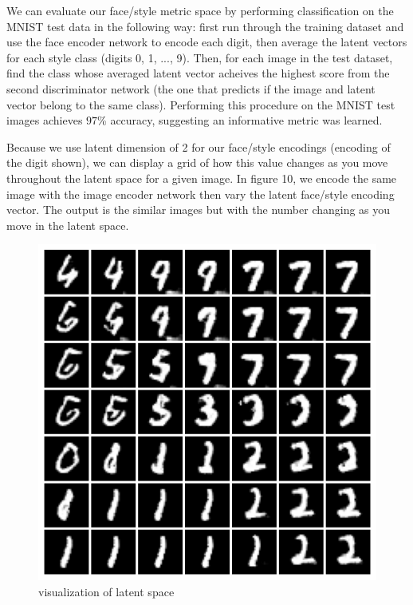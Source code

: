 \documentclass{article}
\begin{document}
\clearpage

We can evaluate our face/style metric space by performing classification on the MNIST test data in the following way:
first run through the training dataset and use the face encoder network to encode each digit,
then average the latent vectors for each style class (digits 0, 1, ..., 9).
Then, for each image in the test dataset, find the class whose averaged latent vector acheives the highest score from
the second discriminator network (the one that predicts if the image and latent vector belong to the same class).
Performing this procedure on the MNIST test images achieves $97$\% accuracy, suggesting an informative metric was learned.


Because we use latent dimension of 2 for our face/style encodings (encoding of the digit shown),
we can display a grid of how this value changes as you move throughout the latent space for a given image.
In figure 10, we encode the same image with the image encoder network then vary the latent face/style encoding vector.
The output is the similar images but with the number changing as you move in the latent space.

\begin{figure}[hbt]
	\centering
	\includegraphics[scale=0.5]{images/mnist_latent_crisp_50.png}
	\caption{visualization of latent space}
	\label{fig:fig3}

\end{figure}
\end{document}
